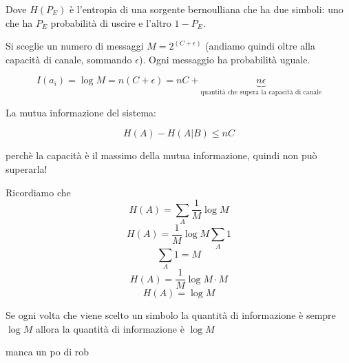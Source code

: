 Dove $H(P_E)$ è l'entropia di una sorgente bernoulliana che ha due simboli: uno che ha $P_E$ probabilità di uscire e l'altro $1 - P_E$.


Si sceglie un numero di messaggi $M=2^{(C+\epsilon)}$ (andiamo quindi oltre alla capacità di canale, sommando $\epsilon$). Ogni messaggio ha probabilità uguale.

\begin{equation*}
I(a_i) = \log M = n(C+\epsilon) = nC + \underbrace{n\epsilon}_{\text{quantità che supera la capacità di canale}}
\end{equation*}

La mutua informazione del sistema:

\begin{equation*}
H(A) - H(A|B) \leq nC
\end{equation*}

perchè la capacità è il massimo della mutua informazione, quindi non può superarla!


Ricordiamo che
\begin{equation*}
H(A) = \sum_A\frac{1}{M}\log M
\end{equation*}
\begin{equation*}
H(A) = \frac{1}{M}\log M \sum_A 1
\end{equation*}
\begin{equation*}
\sum_A 1 = M
\end{equation*}
\begin{equation*}
H(A) = \frac{1}{M}\log M \cdot M
\end{equation*}
\begin{equation*}
H(A) = \log M
\end{equation*}

Se ogni volta che viene scelto un simbolo la quantità di informazione è sempre $\log M$ allora la quantità di informazione è $\log M$

manca un po di rob

